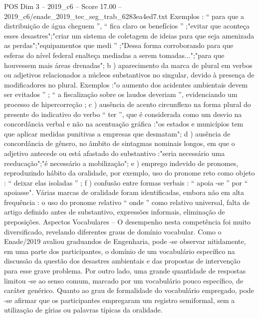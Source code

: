 \begin{textsample}{POS Dim 3 – 2019\_c6 – Score 17.00 – 2019\_c6/enade\_2019\_tec\_seg\_trab\_6283ea4ed7.txt}
Exemplos : “ para que a distribuição de água cheguem ”, “ fica claro os benefícios ” ;"evitar que aconteça esses desastres";"criar um sistema de coletagem de ideias para que seja amenizada as perdas";"equipamentos que medi ” ;"Dessa forma corroborando para que esferas do nível federal enalteça mediadas a serem tomadas...";"para que houvessem mais áreas drenadas"; b ) aparecimento da marca de plural em verbos ou adjetivos relacionados a núcleos substantivos no singular, devido à presença de modificadores no plural.
Exemplos :"o aumento dos acidentes ambientais devem ser evitados ” ; “ a fiscalização sobre os laudos deveriam ”, evidenciando um processo de hipercorreção ; c ) ausência de acento circunflexo na forma plural do presente do indicativo do verbo “ ter ”, que é considerada como um desvio na concordância verbal e não na acentuação gráfica :"os estados e municípios tem que aplicar medidas punitivas a empresas que desmatam"; d ) ausência de concordância de gênero, no âmbito de sintagmas nominais longos, em que o adjetivo antecede ou está afastado do substantivo :"seria necessário uma reeducação";"é necessário a mobilização"; e ) emprego indevido de pronomes, reproduzindo hábito da oralidade, por exemplo, uso do pronome reto como objeto : “ deixar elas isoladas ” ; f ) confusão entre formas verbais : “ apoia -se ” por “ apoiasse".
Várias marcas de oralidade foram identificadas, embora não em alta frequência : o uso do pronome relativo “ onde ” como relativo universal, falta de artigo definido antes de substantivo, expressões informais, eliminação de preposições.
Aspectos Vocabulares – O desempenho nesta competência foi muito diversificado, revelando diferentes graus de domínio vocabular.
Como o Enade/2019 avaliou graduandos de Engenharia, pode -se observar nitidamente, em uma parte dos participantes, o domínio de um vocabulário específico na discussão da questão dos desastres ambientais e das propostas de intervenção para esse grave problema.
Por outro lado, uma grande quantidade de respostas limitou -se ao senso comum, marcado por um vocabulário pouco específico, de caráter genérico.
Quanto ao grau de formalidade do vocabulário empregado, pode -se afirmar que os participantes empregaram um registro semiformal, sem a utilização de gírias ou palavras típicas da oralidade.

\end{textsample}
